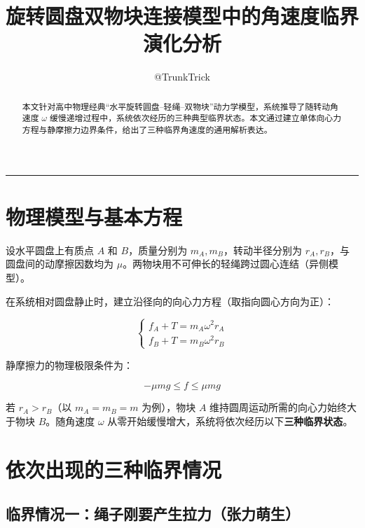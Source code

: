 \documentclass[12pt,a4paper]{ctexart}
\title{\textbf{旋转圆盘双物块连接模型中的角速度临界演化分析}}
\author{@TrunkTrick}
\date{}
\begin{document}
\maketitle

\begin{center}
\rule{0.8\textwidth}{0.4pt}
\end{center}

\begin{abstract}
\noindent 本文针对高中物理经典``水平旋转圆盘--轻绳--双物块''动力学模型，系统推导了随转动角速度 $\omega$ 缓慢递增过程中，系统依次经历的三种典型临界状态。本文通过建立单体向心力方程与静摩擦力边界条件，给出了三种临界角速度的通用解析表达。
\end{abstract}

\section{物理模型与基本方程}

设水平圆盘上有质点 $A$ 和 $B$，质量分别为 $m_A, m_B$，转动半径分别为 $r_A, r_B$，与圆盘间的动摩擦因数均为 $\mu$。两物块用不可伸长的轻绳跨过圆心连结（异侧模型）。

在系统相对圆盘静止时，建立沿径向的向心力方程（取指向圆心方向为正）：

\begin{equation}
\begin{cases}
f_A + T = m_A \omega^2 r_A \\[6pt]
f_B + T = m_B \omega^2 r_B
\end{cases}
\end{equation}

静摩擦力的物理极限条件为：

\begin{equation}
-\mu m g \le f \le \mu m g
\end{equation}

若 $r_A > r_B$（以 $m_A = m_B = m$ 为例），物块 $A$ 维持圆周运动所需的向心力始终大于物块 $B$。随角速度 $\omega$ 从零开始缓慢增大，系统将依次经历以下\textbf{三种临界状态}。

\section{依次出现的三种临界情况}

\subsection{临界情况一：绳子刚要产生拉力（张力萌生）}
\end{document}
